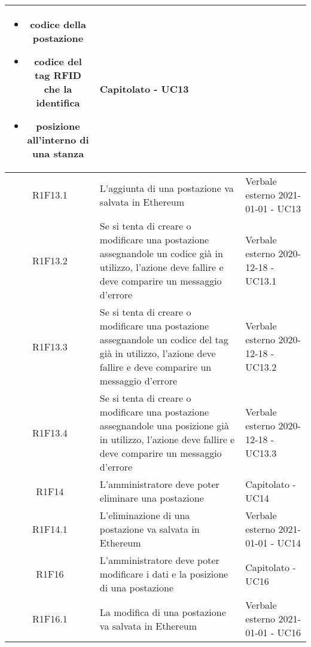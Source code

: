 \begin{center}
\begin{longtable}{|c|p{10cm}|p{4cm}|}
\begin{itemize}
			\item codice della postazione
			\item codice del tag RFID che la identifica
			\item posizione all'interno di una stanza
		\end{itemize} & Capitolato - UC13	\\
		\hline
		R1F13.1&L'aggiunta di una postazione va salvata in Ethereum	&Verbale esterno 2021-01-01 - UC13 	\\
		\hline
		R1F13.2&	Se si tenta di creare o modificare una postazione assegnandole un codice già in utilizzo, l'azione deve fallire e deve comparire un messaggio d'errore& Verbale esterno 2020-12-18 - UC13.1 	\\
		\hline
		R1F13.3&Se si tenta di creare o modificare una postazione assegnandole un codice del tag già in utilizzo, l'azione deve fallire e deve comparire un messaggio d'errore	&Verbale esterno 2020-12-18 - UC13.2 	\\
		\hline
		R1F13.4&Se si tenta di creare o modificare una postazione assegnandole una posizione già in utilizzo, l'azione deve fallire e deve comparire un messaggio d'errore	&Verbale esterno 2020-12-18 - UC13.3 	\\
		\hline
		R1F14&L'amministratore deve poter eliminare una postazione	& Capitolato - UC14	\\
		\hline
		R1F14.1	&L'eliminazione di una postazione va salvata in Ethereum	& Verbale esterno 2021-01-01 - UC14	\\
		\hline
		R1F16&L'amministratore deve poter modificare i dati e la posizione di una postazione	& Capitolato - UC16	\\
		\hline
		R1F16.1&	La modifica di una postazione va salvata in Ethereum& Verbale esterno 2021-01-01 - UC16	\\
		\hline
		

\end{longtable}
\end{center}
